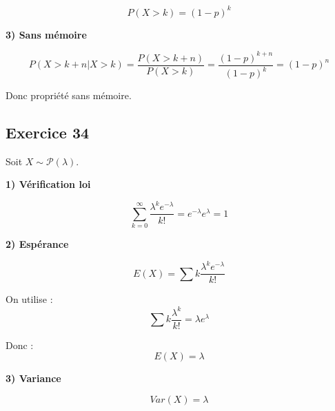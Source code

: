 \documentclass[11pt,a4paper]{article}
\begin{document}
\[
P(X>k)=(1-p)^k
\]

\textbf{3) Sans mémoire}

\[
P(X>k+n|X>k)=\frac{P(X>k+n)}{P(X>k)}=\frac{(1-p)^{k+n}}{(1-p)^k}=(1-p)^n
\]

Donc propriété sans mémoire.

\subsection*{Exercice 34}

Soit $X \sim \mathcal{P}(\lambda)$.

\textbf{1) Vérification loi}

\[
\sum_{k=0}^\infty \frac{\lambda^k e^{-\lambda}}{k!}
= e^{-\lambda} e^\lambda = 1
\]

\textbf{2) Espérance}

\[
E(X)=\sum k \frac{\lambda^k e^{-\lambda}}{k!}
\]

On utilise :
\[
\sum k \frac{\lambda^k}{k!} = \lambda e^\lambda
\]

Donc :
\[
E(X)=\lambda
\]

\textbf{3) Variance}

\[
Var(X)=\lambda
\]
\end{document}

